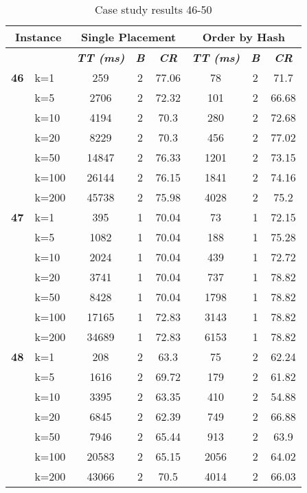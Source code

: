     \begin{table}[htbp]
    \caption{Case study results 46-50}
    \centering
    \begin{tabular}{|l|l|c|c|c|c|c|c|}
    \hline
    \multicolumn{ 2}{|c|}{\textbf{Instance}} & \multicolumn{ 3}{c|}{\textbf{Single Placement}} & \multicolumn{ 3}{c|}{\textbf{Order by Hash}} \\ \hline
    \multicolumn{ 2}{|l|}{} & \textbf{\textit{TT (ms)}} & \textbf{\textit{B}} & \textbf{\textit{CR}} & \textbf{\textit{TT (ms)}} & \textbf{\textit{B}} & \textbf{\textit{CR}} \\ \hline
    \multicolumn{1}{|r|}{\textbf{46}} & k=1 & 259 & 2 & 77.06 & 78 & 2 & 71.7 \\ 
     & k=5 & 2706 & 2 & 72.32 & 101 & 2 & 66.68 \\ 
     & k=10 & 4194 & 2 & 70.3 & 280 & 2 & 72.68 \\ 
     & k=20 & 8229 & 2 & 70.3 & 456 & 2 & 77.02 \\ 
     & k=50 & 14847 & 2 & 76.33 & 1201 & 2 & 73.15 \\ 
     & k=100 & 26144 & 2 & 76.15 & 1841 & 2 & 74.16 \\ 
     & k=200 & 45738 & 2 & 75.98 & 4028 & 2 & 75.2 \\ \hline
    \multicolumn{1}{|r|}{\textbf{47}} & k=1 & 395 & 1 & 70.04 & 73 & 1 & 72.15 \\ 
     & k=5 & 1082 & 1 & 70.04 & 188 & 1 & 75.28 \\ 
     & k=10 & 2024 & 1 & 70.04 & 439 & 1 & 72.72 \\ 
     & k=20 & 3741 & 1 & 70.04 & 737 & 1 & 78.82 \\ 
     & k=50 & 8428 & 1 & 70.04 & 1798 & 1 & 78.82 \\ 
     & k=100 & 17165 & 1 & 72.83 & 3143 & 1 & 78.82 \\ 
     & k=200 & 34689 & 1 & 72.83 & 6153 & 1 & 78.82 \\ \hline
    \multicolumn{1}{|r|}{\textbf{48}} & k=1 & 208 & 2 & 63.3 & 75 & 2 & 62.24 \\ 
     & k=5 & 1616 & 2 & 69.72 & 179 & 2 & 61.82 \\ 
     & k=10 & 3395 & 2 & 63.35 & 410 & 2 & 54.88 \\ 
     & k=20 & 6845 & 2 & 62.39 & 749 & 2 & 66.88 \\ 
     & k=50 & 7946 & 2 & 65.44 & 913 & 2 & 63.9 \\ 
     & k=100 & 20583 & 2 & 65.15 & 2056 & 2 & 64.02 \\ 
     & k=200 & 43066 & 2 & 70.5 & 4014 & 2 & 66.03 \\ \hline

\end{tabular}
\end{table}
